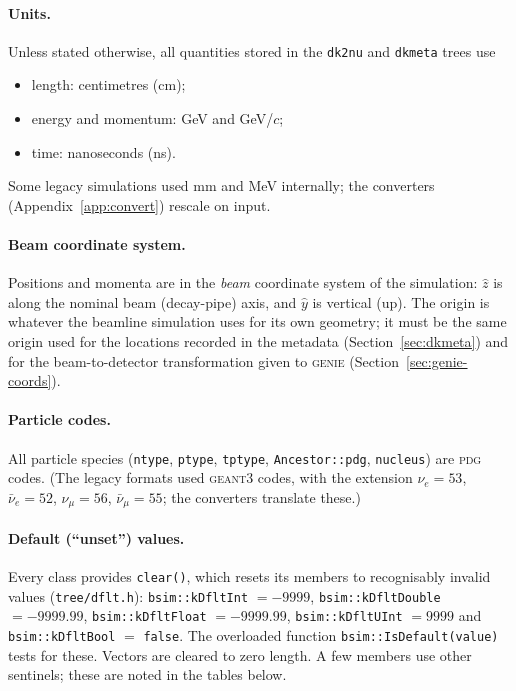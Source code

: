 \documentclass[11pt]{article}
\newcommand{\code}[1]{\texttt{#1}}
\newcommand{\genie}{\textsc{genie}\xspace}
\newcommand{\geant}{\textsc{geant}\xspace}
\newcommand{\dktwonu}{\texttt{dk2nu}\xspace}
\newcommand{\sect}[1]{Section~\ref{sec:#1}}
\newcommand{\app}[1]{Appendix~\ref{app:#1}}
\begin{document}
\paragraph{Units.}  Unless stated otherwise, all quantities stored in the
\dktwonu and \code{dkmeta} trees use
\begin{itemize}[nosep]
\item length: centimetres (cm);
\item energy and momentum: GeV and GeV/$c$;
\item time: nanoseconds (ns).
\end{itemize}
Some legacy simulations used mm and MeV internally; the converters
(\app{convert}) rescale on input.

\paragraph{Beam coordinate system.}  Positions and momenta are in the
\emph{beam} coordinate system of the simulation: $\hat z$ is along the
nominal beam (decay-pipe) axis, and $\hat y$ is vertical (up).  The origin
is whatever the beamline simulation uses for its own geometry; it must be
the same origin used for the locations recorded in the metadata
(\sect{dkmeta}) and for the beam-to-detector transformation given to \genie
(\sect{genie-coords}).

\paragraph{Particle codes.}  All particle species (\code{ntype},
\code{ptype}, \code{tptype}, \code{Ancestor::pdg}, \code{nucleus}) are
\textsc{pdg} codes.  (The legacy formats used \geant{}3 codes, with the
extension $\nu_e=53$, $\bar\nu_e=52$, $\nu_\mu=56$, $\bar\nu_\mu=55$;
the converters translate these.)

\paragraph{Default (``unset'') values.}  Every class provides
\code{clear()}, which resets its members to recognisably invalid values
(\code{tree/dflt.h}):
\code{bsim::kDfltInt} $=-9999$, \code{bsim::kDfltDouble} $=-9999.99$,
\code{bsim::kDfltFloat} $=-9999.99$, \code{bsim::kDfltUInt} $=9999$ and
\code{bsim::kDfltBool} $=$ \code{false}.  The overloaded function
\code{bsim::IsDefault(value)} tests for these.  Vectors are cleared to
zero length.  A few members use other sentinels; these are noted in the
tables below.
\end{document}
